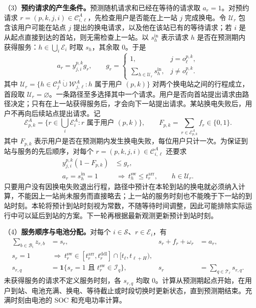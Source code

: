 \documentclass[12pt,a4paper,UTF8]{ctexart}
\begin{document}
（3）\textbf{预约请求的产生条件。}预测随机请求和已经在等待的请求取 $a_r=1$。对预约请求 $r=(p,k,j,i)\in\mathcal C_{i,\ell}^A$，先检查用户是否能在上一站 $j$ 完成换电。令 $\mathcal U_r$ 包含该用户可能在站点 $j$ 提出的换电请求，以及他在该站已有的等待请求；若 $i$ 是从起点直接到达的首站，则无需检查上一站。以 $s_h^{\mathrm{in}}$ 表示请求 $h$ 是否在预测期内获得服务：$h\in\bigcup_i\mathcal E_i$ 时取 $s_h$，其余取 $0$。于是
\begin{equation}
a_r=y_{j,i}^{p,k}g_r,
\qquad
g_r=\begin{cases}
1,&j=o_\ell^{p,k},\\
\displaystyle\sum_{h\in\mathcal U_r}s_h^{\mathrm{in}},&j\ne o_\ell^{p,k}.
\end{cases}
\label{eq:reservation_alive_chain}
\end{equation}
其中 $\mathcal U_r=\{h\in\mathcal C_j^A\mathbin{\dot\cup}\mathcal W_{j,\ell}^A:h\text{ 属于用户 }(p,k)\}$ 对两个换电站之间的行程成立，首段取 $\mathcal U_r=\varnothing$。一条路径至多选择其中一个请求。用户是否向首站提出请求由路径决定；只有在上一站获得服务后，才会向下一站提出请求。某站换电失败后，用户不再向后续站点提出请求。记
\[
\mathcal E_{p,k}^A=\{r\in\textstyle\bigcup_i\mathcal E_i^A:r\text{ 属于用户 }(p,k)\},
\qquad
F_{p,k}=\sum_{r\in\mathcal E_{p,k}^A}f_r\in\{0,1\}.
\]
其中 $F_{p,k}$ 表示用户是否在预测期内发生换电失败，每位用户只计一次。为保证到站与服务的先后顺序，对每个 $r=(p,k,j,i)\in\mathcal C_{i,\ell}^A$ 还要求
\begin{equation}
\begin{aligned}
y_{j,i}^{p,k}(1-F_{p,k})&\le g_r,\\
a_r=s_h^{\mathrm{in}}=1&\ \Longrightarrow\
t_h^{\mathrm{sw}}\le t_r^{\mathrm{arr}},\qquad h\in\mathcal U_r.
\end{aligned}
\label{eq:arrival_causality}
\end{equation}
只要用户没有因换电失败退出行程，路径中预计在本轮到站的换电就必须纳入计算，不能因上一站尚未服务而直接略去；上一站的服务时刻也不能晚于下一站的到站时刻。本轮将预计到站时刻视为常数，不随等待时间调整，因此可能排除实际运行中可以延后到站的方案。下一轮再根据最新观测更新预计到站时刻。

（4）\textbf{服务顺序与电池分配。}对每个 $i\in\mathcal S$、$r\in\mathcal E_i$，有
\begin{equation}
\begin{aligned}
\sum_{b\in\mathcal B_i}z_{r,b}&=s_r,
&s_r+f_r+\omega_r&=a_r,\\
s_r=1&\ \Longrightarrow\
t_r^{\mathrm{sw}}\in[t_r^{\mathrm{arr}},t_r^{\mathrm{ddl}}]
\cap[t_\ell,t_{\ell+H}),\\
s_{r,q}&=\mathbf1\{s_r=1\text{ 且 }t_r^{\mathrm{sw}}\in\mathcal I_q\},
&s_r&=\sum_{q\in\mathcal T_\ell}s_{r,q}.
\end{aligned}
\label{eq:service_window}
\end{equation}
未获得服务的请求不定义服务时刻，各 $s_{r,q}$ 均取 $0$。计算从预测期起点开始，在用户到站、电池充满、换电、等待截止或时段切换时更新状态，直到预测期结束。充满时刻由电池的 SOC 和充电功率计算。
\end{document}

